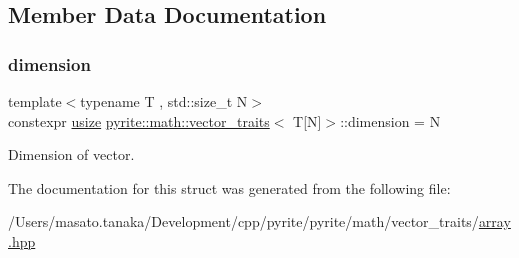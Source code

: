 \subsection{Member Data Documentation}
\mbox{\label{structpyrite_1_1math_1_1vector__traits_3_01_t[_n]_4_a7afc072ea1bfd989f6b383a1a6cb788b}} 
\subsubsection{\texorpdfstring{dimension}{dimension}}
{\footnotesize\ttfamily template$<$typename T , std\+::size\+\_\+t N$>$ \\
constexpr \mbox{\hyperlink{type_8hpp_a3984e6dc0a53b867e054e8447f2f2be1}{usize}} \mbox{\hyperlink{structpyrite_1_1math_1_1vector__traits}{pyrite\+::math\+::vector\+\_\+traits}}$<$ T\mbox{[}N\mbox{]}$>$\+::dimension = N\hspace{0.3cm}{\ttfamily [static]}}

Dimension of vector. 

The documentation for this struct was generated from the following file\+:\begin{DoxyCompactItemize}
\item 
/\+Users/masato.\+tanaka/\+Development/cpp/pyrite/pyrite/math/vector\+\_\+traits/\mbox{\hyperlink{array_8hpp}{array.\+hpp}}\end{DoxyCompactItemize}
